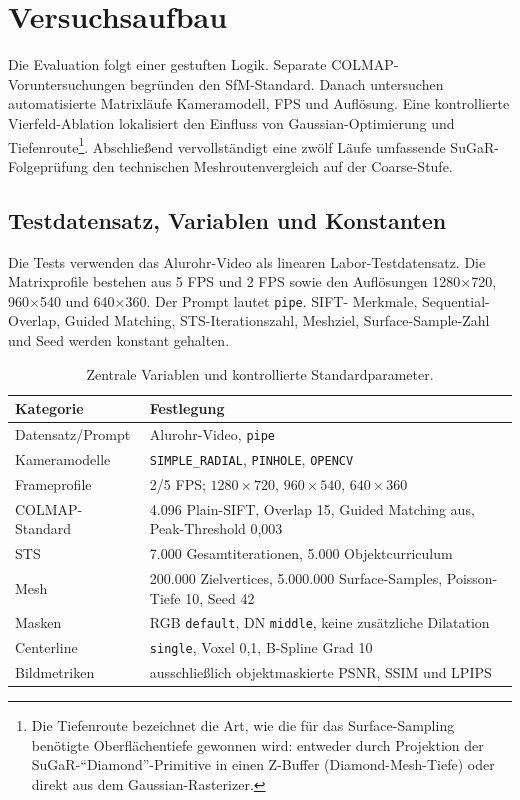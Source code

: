 \section{Versuchsaufbau}
\label{sec:versuchsaufbau}

Die Evaluation folgt einer gestuften Logik. Separate COLMAP-Voruntersuchungen
begründen den SfM-Standard. Danach untersuchen automatisierte Matrixläufe
Kameramodell, FPS und Auflösung. Eine kontrollierte Vierfeld-Ablation lokalisiert
den Einfluss von Gaussian-Optimierung und Tiefenroute\footnote{Die
Tiefenroute bezeichnet die Art, wie die für das Surface-Sampling benötigte
Oberflächentiefe gewonnen wird: entweder durch Projektion der
SuGaR-``Diamond''-Primitive in einen Z-Buffer (Diamond-Mesh-Tiefe) oder
direkt aus dem Gaussian-Rasterizer.}. Abschließend
vervollständigt eine zwölf Läufe umfassende SuGaR-Folgeprüfung den technischen
Meshroutenvergleich auf der Coarse-Stufe.

\subsection{Testdatensatz, Variablen und Konstanten}

Die Tests verwenden das Alurohr-Video als linearen Labor-Testdatensatz. Die
Matrixprofile bestehen aus 5 FPS und 2 FPS sowie den Auflösungen 1280$\times$720,
960$\times$540 und 640$\times$360. Der Prompt lautet \texttt{pipe}. SIFT-
Merkmale, Sequential-Overlap, Guided Matching, STS-Iterationszahl, Meshziel,
Surface-Sample-Zahl und Seed werden konstant gehalten.

\begin{table}[H]
\centering
\small
\begin{tabularx}{\textwidth}{p{3.5cm}X}
\toprule
Kategorie & Festlegung\\
\midrule
Datensatz/Prompt & Alurohr-Video, \texttt{pipe}\\
Kameramodelle & \texttt{SIMPLE\_RADIAL}, \texttt{PINHOLE}, \texttt{OPENCV}\\
Frameprofile & 2/5 FPS; $1280\times720$, $960\times540$, $640\times360$\\
COLMAP-Standard & 4.096 Plain-SIFT, Overlap 15, Guided Matching aus,
Peak-Threshold 0,003\\
STS & 7.000 Gesamtiterationen, 5.000 Objektcurriculum\\
Mesh & 200.000 Zielvertices, 5.000.000 Surface-Samples, Poisson-Tiefe 10,
Seed 42\\
Masken & RGB \texttt{default}, DN \texttt{middle}, keine zusätzliche
Dilatation\\
Centerline & \texttt{single}, Voxel 0,1, B-Spline Grad 10\\
Bildmetriken & ausschließlich objektmaskierte PSNR, SSIM und LPIPS\\
\bottomrule
\end{tabularx}
\caption{Zentrale Variablen und kontrollierte Standardparameter.}
\label{tab:versuchsparameter}
\end{table}

